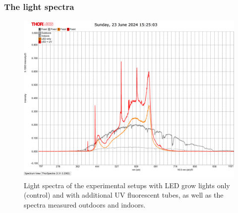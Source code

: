 \documentclass[12pt, aspectratio=1610]{beamer}
\begin{document}
    \begin{frame}
        \frametitle{The light spectra}
        \begin{figure}
            \includegraphics[width=0.6\linewidth]{../../data/light-spectra_outdoors_indoors_led_led+uv}
            \caption{Light spectra of the experimental setups with LED grow lights only (control) and with additional UV fluorescent tubes, as well as the spectra measured outdoors and indoors.}
        \end{figure}
    \end{frame}
\end{document}

